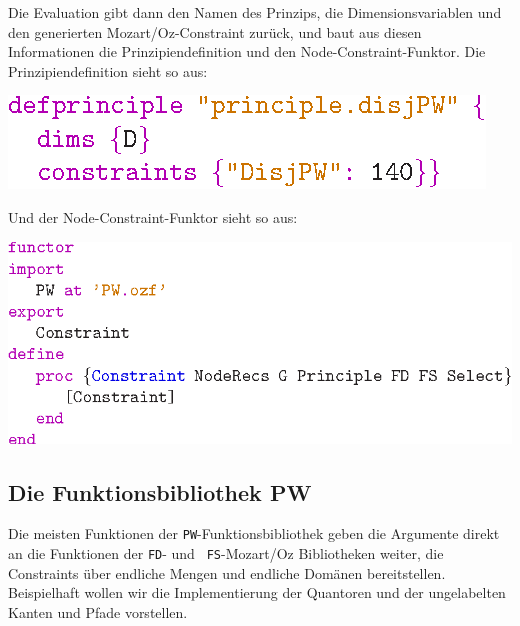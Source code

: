 Die Evaluation gibt dann den Namen des Prinzips, die
Dimensionsvariablen und den generierten Mozart/Oz-Constraint zur\"uck,
und baut aus diesen Informationen die Prinzipiendefinition und den
Node-Constraint-Funktor. Die Prinzipiendefinition sieht so aus:
\begin{center}
\includegraphics[scale=1.0]{eps/defprincipledisj}
\end{center}
Und der Node-Constraint-Funktor sieht so aus:
\begin{center}
\includegraphics[scale=1.0]{eps/disjnc}
\end{center}

\subsection{Die Funktionsbibliothek PW}

Die meisten Funktionen der {\tt PW}-Funktionsbibliothek geben die
Argumente direkt an die Funktionen der {\tt FD}- und {\tt
  FS}-Mozart/Oz Bibliotheken weiter, die Constraints \"uber endliche
Mengen und endliche Dom\"anen bereitstellen. Beispielhaft wollen wir
die Implementierung der Quantoren und der ungelabelten Kanten und
Pfade vorstellen.

